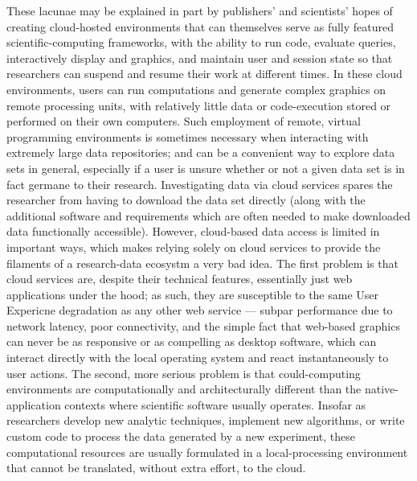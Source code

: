 \documentclass[11pt,letterpaper]{article}
\newcommand{\ThreeD}{\resizebox{!}{7pt}{\AcronymText{3D}}}
\newcommand{\TwoD}{\resizebox{!}{7pt}{\AcronymText{2D}}}
\newcommand{\textscc}[1]{{\color{orr!35!black}{{%
						\fontfamily{Cabin-TLF}\fontseries{b}\selectfont{\textsc{\scriptsize{#1}}}}}}}
\newcommand{\AcronymText}[1]{{\textscc{#1}}}
\newcommand{\p}[1]{

\vspace{1em}#1}
\begin{document}
{\p{These lacunae may be explained in part by publishers' 
and scientists' hopes of creating cloud-hosted 
environments that can themselves serve as fully featured 
scientific-computing frameworks, with the ability 
to run code, evaluate queries, interactively 
display \TwoD{} and \ThreeD{} graphics, and 
maintain user and session state so that 
researchers can suspend and resume their work 
at different times.  In these cloud environments, 
users can run computations and generate complex 
graphics on remote processing units, with relatively 
little data or code-execution stored or performed 
on their own computers.  Such employment of remote, 
virtual programming environments is sometimes necessary 
when interacting with extremely large data repositories; 
and can be a convenient way to explore data sets 
in general, especially if a user is unsure whether 
or not a given data set is in fact germane to 
their research.  Investigating data via cloud 
services spares the researcher from having to 
download the data set directly (along with 
the additional software and requirements which 
are often needed to make downloaded data functionally 
accessible).  However, cloud-based data access is 
limited in important ways, which makes relying 
solely on cloud services to provide the 
filaments of a research-data ecosystm a very bad 
idea.  The first problem is that cloud services 
are, despite their technical features, essentially 
just web applications under the hood; as such, 
they are susceptible to the same User Expericne 
degradation as any other web service --- subpar 
performance due to network latency, poor connectivity, 
and the simple fact that web-based graphics can 
never be as responsive or as compelling as 
desktop software, which can interact directly 
with the local operating system and react 
instantaneously to user actions.  The second, 
more serious problem is that could-computing 
environments are computationally and 
architecturally different than the native-application 
contexts where scientific software usually 
operates.  Insofar as researchers develop 
new analytic techniques, implement new algorithms, 
or write custom code to process the data 
generated by a new experiment, these 
computational resources are usually 
formulated in a local-processing environment that 
cannot be translated, without extra 
effort, to the cloud.}

}
\end{document}
